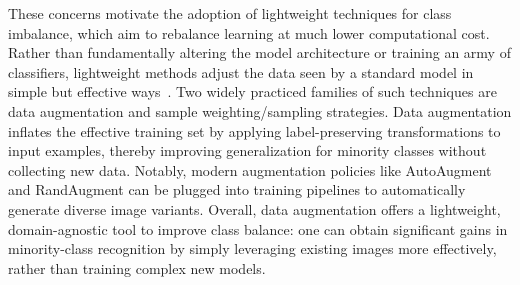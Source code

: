These concerns motivate the adoption of lightweight techniques for class imbalance, which aim to rebalance learning at much lower computational cost. Rather than fundamentally altering the model architecture or training an army of classifiers, lightweight methods adjust the data seen by a standard model in simple but effective ways~\cite{lightweight-longtailed, lightweightfightingmodel}. Two widely practiced families of such techniques are data augmentation and sample weighting/sampling strategies. Data augmentation inflates the effective training set by applying label-preserving transformations to input examples, thereby improving generalization for minority classes without collecting new data. Notably, modern augmentation policies like AutoAugment \cite{cubuk2018autoaugment} and RandAugment \cite{cubuk2019randaugment} can be plugged into training pipelines to automatically generate diverse image variants. 
Overall, data augmentation offers a lightweight, domain-agnostic tool to improve class balance: one can obtain significant gains in minority-class recognition by simply leveraging existing images more effectively, rather than training complex new models. 

